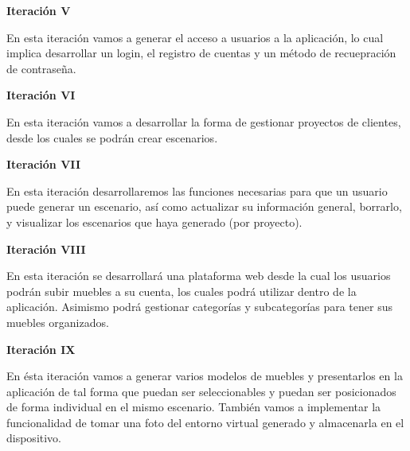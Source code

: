 \textbf{Iteración V} \par
En esta iteración vamos a generar el acceso a usuarios a la aplicación, lo cual implica desarrollar un login, el registro de cuentas y un método de recuepración de contraseña.

\textbf{Iteración VI} \par
En esta iteración vamos a desarrollar la forma de gestionar proyectos de clientes, desde los cuales se podrán crear escenarios.

\textbf{Iteración VII} \par
En esta iteración desarrollaremos las funciones necesarias para que un usuario puede generar un escenario, así como actualizar su información general, borrarlo, y visualizar los escenarios que haya generado (por proyecto).

\textbf{Iteración VIII} \par
En esta iteración se desarrollará una plataforma web desde la cual los usuarios podrán subir muebles a su cuenta, los cuales podrá utilizar dentro de la aplicación. Asimismo podrá gestionar categorías y subcategorías para tener sus muebles organizados.

\textbf{Iteración IX} \par
En ésta iteración vamos a generar varios modelos de muebles y presentarlos en la aplicación de tal forma que puedan ser seleccionables y puedan ser posicionados de forma individual en el mismo escenario. También vamos a implementar la funcionalidad de tomar una foto del entorno virtual generado y almacenarla en el dispositivo.





